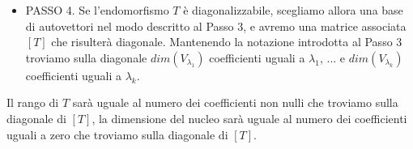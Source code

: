 \begin{itemize}
	      Osserviamo che abbiamo gi\`a un criterio per dire se $T$ \`e diagonalizzabile o no.
	      Ovvero, se
	      \begin{equation*}
		      dim(V_{\lambda_1}) + \cdots + dim(V_{\lambda_k}) = n = dim(V)
	      \end{equation*}
	      altrimenti se
	      \begin{equation*}
		      dim(V_{\lambda_1}) + \cdots + dim(V_{\lambda_k}) < n = dim(V)
	      \end{equation*}
	      $T$ non \`e diagonalizzabile. Infatti non \`e possibile trovare una base di
	      autovettori.
	\item PASSO 4. Se l'endomorfismo $T$ \`e diagonalizzabile, scegliamo allora una base di
	      autovettori nel modo descritto al Passo 3, e avremo una matrice associata $[T]$ che
	      risulter\`a diagonale. Mantenendo la notazione introdotta al Passo 3 troviamo sulla
	      diagonale $dim(V_{\lambda_1})$ coefficienti uguali a
	      $\lambda_1$, ... e $dim(V_{\lambda_k})$ coefficienti uguali a $\lambda_k$.
\end{itemize}
Il rango di $T$ sar\`a uguale al numero dei coefficienti non nulli che troviamo
sulla diagonale di $[T]$, la dimensione del nucleo sar\`a uguale al numero dei
coefficienti uguali a zero che troviamo sulla diagonale di $[T]$.

